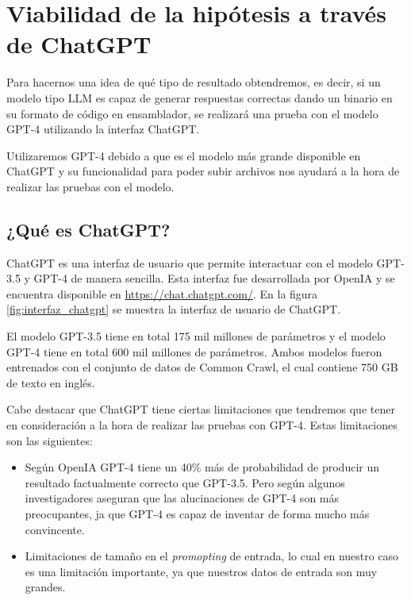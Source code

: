 \chapter{Viabilidad de la hipótesis a través de ChatGPT}
\label{cap:viabilidad_hipotesis}


Para hacernos una idea de qué tipo de resultado obtendremos, es decir, si un modelo
tipo LLM es capaz de generar respuestas correctas dando un binario en su formato
de código en ensamblador, se realizará una prueba con el modelo GPT-4 utilizando
la interfaz ChatGPT.

Utilizaremos GPT-4 debido a que es el modelo más grande disponible en ChatGPT y su
funcionalidad para poder subir archivos nos ayudará a la hora de realizar las pruebas
con el modelo.

\section{¿Qué es ChatGPT?}
\label{sec:que_es_chatgpt}


ChatGPT es una interfaz de usuario que permite interactuar con el modelo GPT-3.5 y GPT-4
de manera sencilla. Esta interfaz fue desarrollada por OpenIA y se encuentra disponible
en \url{https://chat.chatgpt.com/}. En la figura \ref{fig:interfaz_chatgpt} se muestra la interfaz
de usuario de ChatGPT.

El modelo GPT-3.5 tiene en total 175 mil millones de parámetros y el modelo GPT-4 tiene
en total 600 mil millones de parámetros. Ambos modelos fueron entrenados con el conjunto
de datos de Common Crawl, el cual contiene 750 GB de texto en inglés.

Cabe destacar que ChatGPT tiene ciertas limitaciones que tendremos que tener en consideración
a la hora de realizar las pruebas con GPT-4. Estas limitaciones son las siguientes:

\begin{itemize}
    \item Según OpenIA GPT-4 tiene un 40\% más de probabilidad de producir un resultado
        factualmente correcto que GPT-3.5. Pero según algunos investigadores aseguran que las
        alucinaciones de GPT-4 son más preocupantes, ja que GPT-4 es capaz de inventar
        de forma mucho más convincente.
    \item Limitaciones de tamaño en el \textit{promopting} de entrada, lo cual en nuestro
        caso es una limitación importante, ya que nuestros datos de entrada son muy grandes.
\end{itemize}

